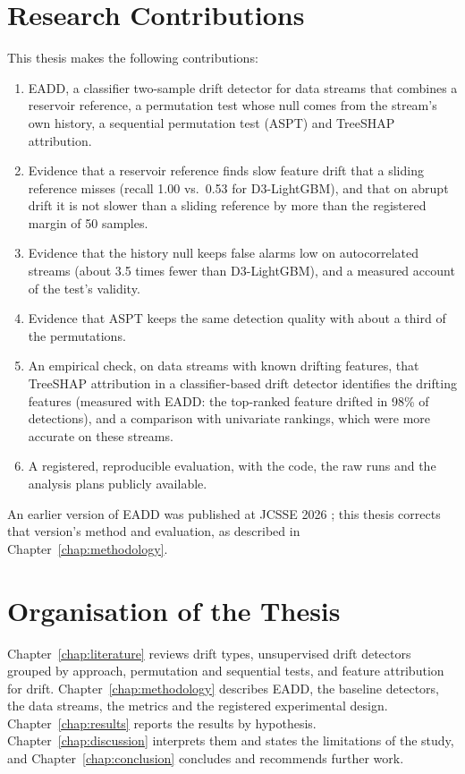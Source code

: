 \section{Research Contributions}
\label{sec:intro-contributions}
This thesis makes the following contributions:

\begin{enumerate}
    \item EADD, a classifier two-sample drift detector for data streams that combines a reservoir reference, a permutation test whose null comes from the stream's own history, a sequential permutation test (ASPT) and TreeSHAP attribution.
    \item Evidence that a reservoir reference finds slow feature drift that a sliding reference misses (recall 1.00 vs.\ 0.53 for D3-LightGBM), and that on abrupt drift it is not slower than a sliding reference by more than the registered margin of 50 samples.
    \item Evidence that the history null keeps false alarms low on autocorrelated streams (about 3.5 times fewer than D3-LightGBM), and a measured account of the test's validity.
    \item Evidence that ASPT keeps the same detection quality with about a third of the permutations.
    \item An empirical check, on data streams with known drifting features, that TreeSHAP attribution in a classifier-based drift detector identifies the drifting features (measured with EADD: the top-ranked feature drifted in 98\% of detections), and a comparison with univariate rankings, which were more accurate on these streams.
    \item A registered, reproducible evaluation, with the code, the raw runs and the analysis plans publicly available.
\end{enumerate}

An earlier version of EADD was published at JCSSE 2026 \citep{Begum2026JCSSE}; this thesis corrects that version's method and evaluation, as described in Chapter~\ref{chap:methodology}.

\section{Organisation of the Thesis}
Chapter~\ref{chap:literature} reviews drift types, unsupervised drift detectors grouped by approach, permutation and sequential tests, and feature attribution for drift. Chapter~\ref{chap:methodology} describes EADD, the baseline detectors, the data streams, the metrics and the registered experimental design. Chapter~\ref{chap:results} reports the results by hypothesis. Chapter~\ref{chap:discussion} interprets them and states the limitations of the study, and Chapter~\ref{chap:conclusion} concludes and recommends further work.
